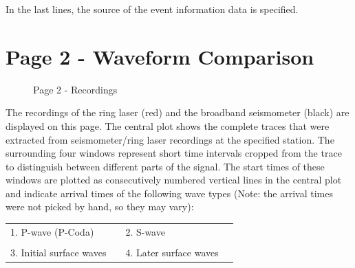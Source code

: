 \documentclass[a4paper,10pt]{article}
\begin{document}
In the last lines, the source of the event information data is specified.

\newpage

\section*{Page 2 - Waveform Comparison}

\begin{figure}[h!]
\centering
 \caption{Page 2 - Recordings}
 \label{page2}
\end{figure}

The  recordings  of  the  ring  laser  (red)  and  the  broadband  seismometer  (black)  are  displayed  on  this  page.
The  central  plot  shows  the  complete  traces  that  were  extracted  from  seismometer/ring  laser  recordings  at  the
specified station.  The surrounding four windows represent short time intervals cropped from the trace to distinguish between different parts of the signal.
The start times of these windows are plotted as consecutively numbered vertical lines in the central plot and indicate arrival times of the following wave types (Note: the arrival times were not picked by hand, so they may vary):\\

\begin{tabular}{llll}
	\hspace{2cm} 1. P-wave (P-Coda) & \hspace{4cm} & 2. S-wave & \\
	&&&\\
	\hspace{2cm} 3. Initial surface waves          & \hspace{4cm} & 4. Later surface waves & \\
\end{tabular}
\end{document}
